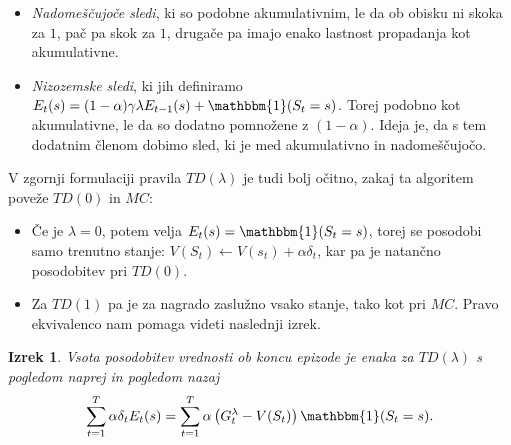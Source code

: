 \documentclass[12pt,a4paper]{amsart}
\theoremstyle{definition} %
\theoremstyle{plain} %
\newtheorem{izrek}[definicija]{Izrek}
\begin{document}
\begin{itemize}
    \item \textit{Nadomeščujoče sledi}, ki so podobne akumulativnim, le da ob obisku ni skoka za 
            $1$, pač pa skok za $1$, drugače pa imajo enako lastnost propadanja kot akumulativne. 
    \item \textit{Nizozemske sledi}, ki jih definiramo $E_t(s) = (1 - \alpha) \gamma \lambda 
            E_{t-1}(s) + \mathbbm{1}(S_t = s)$. Torej podobno kot akumulativne, le da so dodatno 
            pomnožene z $(1 - \alpha)$. Ideja je, da s tem dodatnim členom dobimo sled, ki je med 
            akumulativno in nadomeščujočo.
\end{itemize}

V zgornji formulaciji pravila $TD(\lambda)$ je tudi bolj očitno, zakaj ta algoritem poveže $TD(0)$ 
in $MC$:

\begin{itemize}
    \item Če je $\lambda = 0$, potem velja $E_t(s) = \mathbbm{1}(S_t = s)$, torej se posodobi samo
            trenutno stanje: $V(S_t) \leftarrow V(s_t) + \alpha \delta_t$, kar pa je natančno 
            posodobitev pri $TD(0)$.
    \item Za $TD(1)$ pa je za nagrado zaslužno vsako stanje, tako kot pri $MC$. Pravo ekvivalenco 
            nam pomaga videti naslednji izrek.
\end{itemize}

\begin{izrek}
    Vsota posodobitev vrednosti ob koncu epizode je enaka za $TD(\lambda)$ s pogledom naprej in 
    pogledom nazaj
    $$
    \sum_{t=1}^T \alpha \delta_t E_t(s) = \sum_{t=1}^T \alpha \left( G_t^\lambda - V(S_t) \right) 
    \mathbbm{1}(S_t = s).
    $$
\end{izrek}
\end{document}
